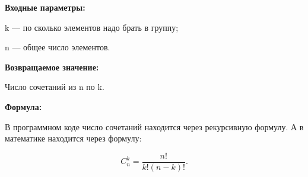 \textbf{Входные параметры:}  
 
 k --- по сколько элементов надо брать в группу;
 
 n --- общее число элементов.

\textbf{Возвращаемое значение:}

 Число сочетаний из n по k.
 
 \textbf{Формула:}
 
 В программном коде число сочетаний находится через рекурсивную формулу. А в математике находится через формулу:
 
 \begin{equation*}
C_n^k=\dfrac{n!}{k!\left( n-k\right)! }.
\end{equation*}